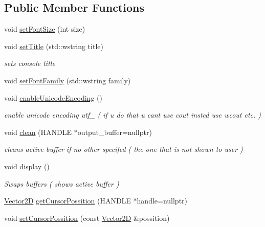 \subsection*{Public Member Functions}
\begin{DoxyCompactItemize}
\item 
void \mbox{\hyperlink{classsc_1_1_console_a175546939e190230b6cd02cbc919c216}{set\+Font\+Size}} (int size)
\item 
void \mbox{\hyperlink{classsc_1_1_console_a9ac084f4c300b486eafe2ef98c812e4f}{set\+Title}} (std\+::wstring title)
\begin{DoxyCompactList}\small\item\em sets console title \end{DoxyCompactList}\item 
void \mbox{\hyperlink{classsc_1_1_console_af54de3629d03639be7d4ac3d52709495}{set\+Font\+Family}} (std\+::wstring family)
\item 
void \mbox{\hyperlink{classsc_1_1_console_abd46f91b6a7bb1f349bac8ac95492efc}{enable\+Unicode\+Encoding}} ()
\begin{DoxyCompactList}\small\item\em enable unicode encoding utf\+\_ ( if u do that u cant use cout insted use wcout etc. ) \end{DoxyCompactList}\item 
void \mbox{\hyperlink{classsc_1_1_console_a1c17eef1630a77861d0695ece0a5d0d8}{clean}} (H\+A\+N\+D\+LE $\ast$output\+\_\+buffer=nullptr)
\begin{DoxyCompactList}\small\item\em cleans active buffer if no other specifed ( the one that is not shown to user ) \end{DoxyCompactList}\item 
void \mbox{\hyperlink{classsc_1_1_console_aa392bbf2aeecd5e86a4e624bcf9b087a}{display}} ()
\begin{DoxyCompactList}\small\item\em Swaps buffers ( shows active buffer ) \end{DoxyCompactList}\item 
\mbox{\hyperlink{classsc_1_1_vector2_d}{Vector2D}} \mbox{\hyperlink{classsc_1_1_console_ae8a907a1f42fa15bccc15ad4f611b37c}{get\+Cursor\+Possition}} (H\+A\+N\+D\+LE $\ast$handle=nullptr)
\item 
void \mbox{\hyperlink{classsc_1_1_console_afbcbbe55d42884df317216f85721afaf}{set\+Cursor\+Possition}} (const \mbox{\hyperlink{classsc_1_1_vector2_d}{Vector2D}} \&possition)

\end{DoxyCompactItemize}
